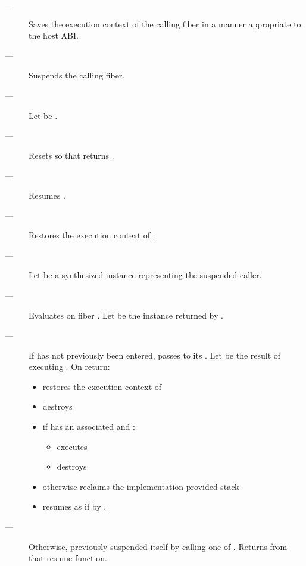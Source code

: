 \effects
\begin{description}
    \item[---] Saves the execution context of the calling fiber in a manner
               appropriate to the host ABI.
    \item[---] Suspends the calling fiber.
    \item[---] Let  be \thefiber{\state}.
    \item[---] Resets \state so that \emptyfn returns \true.
    \item[---] Resumes .
    \item[---] Restores the execution context of .
    \item[---] Let  be a synthesized \fiber instance representing
               the suspended caller.
    \item[---] Evaluates 
               on fiber .
               Let  be the \fiber instance returned by .
    \item[---] If  has not previously been
               entered, passes  to its \entryfn. Let \continuation
               be the result of executing
               . On return:
        \begin{itemize}
            \item restores the execution context of \continuation
            \item destroys 
            \item if  has an associated  and :
                \begin{itemize}
                    \item executes 
                    \item destroys 
                \end{itemize}
            \item otherwise reclaims the implementation-provided stack
            \item resumes \continuation as if by .
        \end{itemize}
    \item[---] Otherwise,  previously
               suspended itself by calling one of \anyresume.
               Returns  from that resume function.
\end{description}


